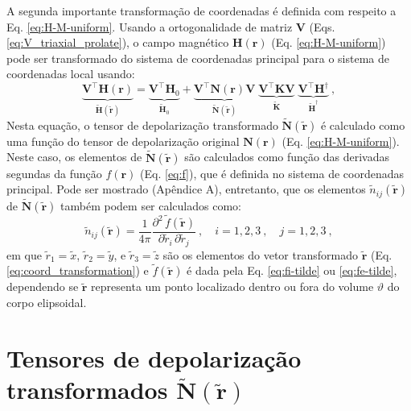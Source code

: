 A segunda importante transformação de coordenadas é definida com respeito a Eq. \ref{eq:H-M-uniform}. Usando a ortogonalidade de matriz $\mathbf{V}$ (Eqs. \ref{eq:V_triaxial_prolate}),
o campo magnético $\mathbf{H}(\mathbf{r})$ (Eq. \ref{eq:H-M-uniform}) pode ser transformado do sistema de coordenadas principal para o sistema de coordenadas local usando:
\begin{equation}
\underbrace{\mathbf{V}^{\top} \mathbf{H}(\mathbf{r})}_{\tilde{\mathbf{H}}(\tilde{\mathbf{r}})} = 
\underbrace{\mathbf{V}^{\top} \mathbf{H}_{0}}_{\tilde{\mathbf{H}}_{0}}
+ \underbrace{\mathbf{V}^{\top} \mathbf{N}(\mathbf{r}) \mathbf{V}}
_{\tilde{\mathbf{N}}(\tilde{\mathbf{r}})} \;
\underbrace{\mathbf{V}^{\top} \mathbf{K} \mathbf{V}}
_{\tilde{\mathbf{K}}} \; 
\underbrace{\mathbf{V}^{\top} \mathbf{H}^{\dagger}}
_{\tilde{\mathbf{H}}^{\dagger}} \: ,
\label{eq:H-tilde}
\end{equation}
Nesta equação, o tensor de depolarização transformado $\tilde{\mathbf{N}}(\tilde{\mathbf{r}})$ é calculado como uma função do tensor de depolarização original $\mathbf{N}(\mathbf{r})$ (Eq. \ref{eq:H-M-uniform}). Neste caso, os elementos de $\tilde{\mathbf{N}}(\tilde{\mathbf{r}})$ são calculados como função das derivadas segundas da função $f(\mathbf{r})$ (Eq. \ref{eq:f}), que é definida no  sistema de coordenadas principal. Pode ser mostrado (Apêndice A), entretanto, que os elementos $\tilde{n}_{ij}(\tilde{\mathbf{r}})$ de
$\tilde{\mathbf{N}}(\tilde{\mathbf{r}})$ também podem ser calculados como:
\begin{equation}
\tilde{n}_{ij}(\tilde{\mathbf{r}}) = 
\frac{1}{4\pi} \frac{\partial^{2} \, \tilde{f}(\tilde{\mathbf{r}})}
{\partial \tilde{r}_{i} \, \partial \tilde{r}_{j}} 
\: , \quad i = 1, 2, 3 \: , \quad j = 1, 2, 3 \: ,
\label{eq:nij-tilde}
\end{equation}
em que $\tilde{r}_{1} = \tilde{x}$, $\tilde{r}_{2} = \tilde{y}$, 
e $\tilde{r}_{3} = \tilde{z}$ são os elementos do vetor transformado $\tilde{\mathbf{r}}$ (Eq. \ref{eq:coord_transformation})
e $\tilde{f}(\tilde{\mathbf{r}})$ é dada pela Eq. \ref{eq:fi-tilde}
ou \ref{eq:fe-tilde}, dependendo se $\tilde{\mathbf{r}}$ representa um ponto localizado dentro ou fora do volume $\vartheta$ do corpo elipsoidal.

\section{Tensores de depolarização transformados $\tilde{\mathbf{N}}(\tilde{\mathbf{r}})$}

